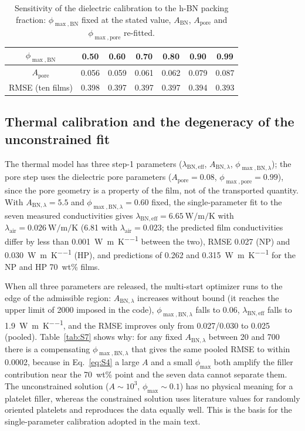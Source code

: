 \documentclass[10pt,a4paper]{article}
\newcommand{\Apore}{\ensuremath{A_{\mathrm{pore}}}}
\newcommand{\ABN}{\ensuremath{A_{\mathrm{BN}}}}
\newcommand{\lamBN}{\ensuremath{\lambda_{\mathrm{BN,eff}}}}
\newcommand{\phimax}{\ensuremath{\phi_{\max}}}
\begin{document}
\begin{table}[htbp]
\centering
\caption{Sensitivity of the dielectric calibration to the h-BN packing fraction: $\phi_{\max,\mathrm{BN}}$ fixed at the stated value, \ABN, \Apore{} and $\phi_{\max,\mathrm{pore}}$ re-fitted.}
\label{tab:S6}
\small
\begin{tabular}{@{}ccccccc@{}}
\toprule
$\phi_{\max,\mathrm{BN}}$ & 0.50 & 0.60 & 0.70 & 0.80 & 0.90 & 0.99 \\
\midrule
\Apore & 0.056 & 0.059 & 0.061 & 0.062 & 0.079 & 0.087 \\
RMSE (ten films) & 0.398 & 0.397 & 0.397 & 0.397 & 0.394 & 0.393 \\
\bottomrule
\end{tabular}
\end{table}

\subsection{Thermal calibration and the degeneracy of the unconstrained fit}
\label{si:degenerate}
The thermal model has three step-1 parameters ($\lamBN$, $A_{\mathrm{BN},\lambda}$, $\phi_{\max,\mathrm{BN},\lambda}$); the pore step uses the dielectric pore parameters ($\Apore = 0.08$, $\phi_{\max,\mathrm{pore}} = 0.99$), since the pore geometry is a property of the film, not of the transported quantity. With $A_{\mathrm{BN},\lambda} = 5.5$ and $\phi_{\max,\mathrm{BN},\lambda} = 0.60$ fixed, the single-parameter fit to the seven measured conductivities gives $\lamBN = \SI{6.65}{\watt\per\meter\per\kelvin}$ with $\lambda_{\mathrm{air}} = \SI{0.026}{\watt\per\meter\per\kelvin}$ (6.81 with $\lambda_{\mathrm{air}} = 0.023$; the predicted film conductivities differ by less than \SI{0.001}{\watt\per\meter\per\kelvin} between the two), RMSE 0.027 (NP) and \SI{0.030}{\watt\per\meter\per\kelvin} (HP), and predictions of 0.262 and \SI{0.315}{\watt\per\meter\per\kelvin} for the NP and HP 70~wt\% films.

When all three parameters are released, the multi-start optimizer runs to the edge of the admissible region: $A_{\mathrm{BN},\lambda}$ increases without bound (it reaches the upper limit of 2000 imposed in the code), $\phi_{\max,\mathrm{BN},\lambda}$ falls to 0.06, $\lamBN$ falls to \SI{1.9}{\watt\per\meter\per\kelvin}, and the RMSE improves only from 0.027/0.030 to 0.025 (pooled). Table~\ref{tab:S7} shows why: for any fixed $A_{\mathrm{BN},\lambda}$ between 20 and 700 there is a compensating $\phi_{\max,\mathrm{BN},\lambda}$ that gives the same pooled RMSE to within 0.0002, because in Eq.~\ref{eq:S4} a large $A$ and a small \phimax{} both amplify the filler contribution near the 70~wt\% point and the seven data cannot separate them. The unconstrained solution ($A \sim 10^3$, $\phimax \sim 0.1$) has no physical meaning for a platelet filler, whereas the constrained solution uses literature values for randomly oriented platelets and reproduces the data equally well. This is the basis for the single-parameter calibration adopted in the main text.
\end{document}
